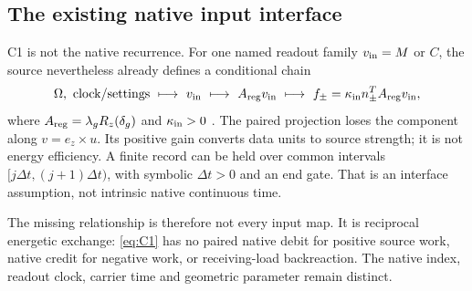 \subsection{The existing native input interface}\label{sec:input}
C1 is not the native recurrence. For one named readout family $v_{\rm in}=M$ or $C$, the source nevertheless already defines a conditional chain
\begin{equation}\label{eq:input}
 \Omega,\text{ clock/settings}\ \longmapsto\ v_{\rm in}
 \ \longmapsto\ A_{\rm reg}v_{\rm in}
 \ \longmapsto\ f_\pm=\kappa_{\rm in}n_\pm^TA_{\rm reg}v_{\rm in},
\end{equation}
where $A_{\rm reg}=\lambda_gR_z(\delta_g)$ and $\kappa_{\rm in}>0$ \cite[typed input chain]{pairedII}. The paired projection loses the component along $v=e_z\times u$. Its positive gain converts data units to source strength; it is not energy efficiency. A finite record can be held over common intervals $[j\Delta t,(j+1)\Delta t)$, with symbolic $\Delta t>0$ and an end gate. That is an interface assumption, not intrinsic native continuous time.

The missing relationship is therefore not every input map. It is reciprocal energetic exchange: \eqref{eq:C1} has no paired native debit for positive source work, native credit for negative work, or receiving-load backreaction. The native index, readout clock, carrier time and geometric parameter remain distinct.
